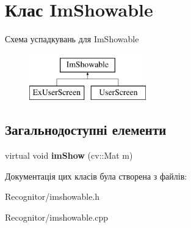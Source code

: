\hypertarget{classImShowable}{\section{Клас Im\-Showable}
\label{classImShowable}
}
Схема успадкувань для Im\-Showable\begin{figure}[H]
\begin{center}
\leavevmode
\includegraphics[height=2.000000cm]{classImShowable}
\end{center}
\end{figure}
\subsection*{Загальнодоступні елементи}
\begin{DoxyCompactItemize}
\item 
\hypertarget{classImShowable_ac178d7603bc79c4909a27757da33a0b6}{virtual void {\bfseries im\-Show} (cv\-::\-Mat m)}\label{classImShowable_ac178d7603bc79c4909a27757da33a0b6}

\end{DoxyCompactItemize}


Документація цих класів була створена з файлів\-:\begin{DoxyCompactItemize}
\item 
Recognitor/imshowable.\-h\item 
Recognitor/imshowable.\-cpp\end{DoxyCompactItemize}
